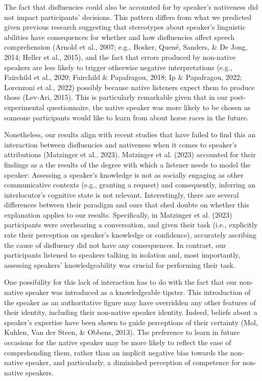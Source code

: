 \documentclass[
  man,floatsintext]{apa7}
\begin{document}
The fact that disfluencies could also be accounted for by speaker's nativeness did not impact participants' decisions. This pattern differs from what we predicted given previous research suggesting that stereotypes about speaker's linguistic abilities have consequences for whether and how disfluencies affect speech comprehension (Arnold et al., 2007; e.g., Bosker, Quené, Sanders, \& De Jong, 2014; Heller et al., 2015), and the fact that errors produced by non-native speakers are less likely to trigger otherwise negative interpretations (e.g., Fairchild et al., 2020; Fairchild \& Papafragou, 2018; Ip \& Papafragou, 2022; Lorenzoni et al., 2022) possibly because native listeners expect them to produce those (Lev-Ari, 2015). This is particularly remarkable given that in our post-experimental questionnaire, the native speaker was more likely to be chosen as someone participants would like to learn from about horse races in the future.

Nonetheless, our results align with recent studies that have failed to find this an interaction between disfluencies and nativeness when it comes to speaker's attributions (Matzinger et al., 2023). Matzinger et al. (2023) accounted for their findings as a the results of the degree with which a listener needs to model the speaker: Assessing a speaker's knowledge is not as socially engaging as other communicative contexts (e.g., granting a request) and consequently, inferring an interlocutor's cognitive state is not relevant. Interestingly, there are several differences between their paradigm and ours that shed doubts on whether this explanation applies to our results. Specifically, in Matzinger et al. (2023) participants were overhearing a conversation, and given their task (i.e., explicitly rate their perception on speaker's knowledge or confidence), accurately ascribing the cause of disfluency did not have any consequences. In contrast, our participants listened to speakers talking in isolation and, most importantly, assessing speakers' knowledgeability was crucial for performing their task.

One possibility for this lack of interaction has to do with the fact that our non-native speaker was introduced as a knowledgeable tipster. This introduction of the speaker as an authoritative figure may have overridden any other features of their identity, including their non-native speaker identity. Indeed, beliefs about a speaker's expertise have been shown to guide perceptions of their certainty (Mol, Kuhlen, Van der Steen, \& Obbens, 2013). The preference to learn in future occasions for the native speaker may be more likely to reflect the ease of comprehending them, rather than an implicit negative bias towards the non-native speaker, and particularly, a diminished perception of competence for non-native speakers.
\end{document}
